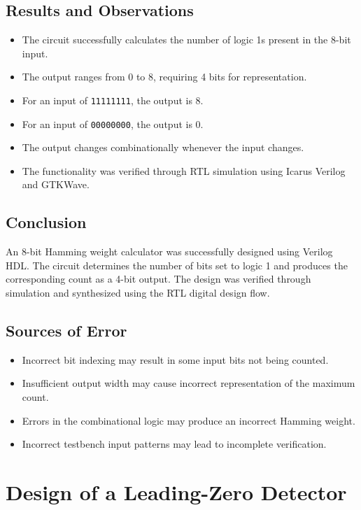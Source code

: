 \documentclass[12pt,a4paper]{report}
\begin{document}
\section{Results and Observations}

\begin{itemize}
    \item The circuit successfully calculates the number of logic 1s present in the 8-bit input.
    \item The output ranges from 0 to 8, requiring 4 bits for representation.
    \item For an input of \texttt{11111111}, the output is 8.
    \item For an input of \texttt{00000000}, the output is 0.
    \item The output changes combinationally whenever the input changes.
    \item The functionality was verified through RTL simulation using Icarus Verilog and GTKWave.
\end{itemize}

\section{Conclusion}

An 8-bit Hamming weight calculator was successfully designed using Verilog HDL. The circuit determines the number of bits set to logic 1 and produces the corresponding count as a 4-bit output. The design was verified through simulation and synthesized using the RTL digital design flow.

\section{Sources of Error}

\begin{itemize}
    \item Incorrect bit indexing may result in some input bits not being counted.
    \item Insufficient output width may cause incorrect representation of the maximum count.
    \item Errors in the combinational logic may produce an incorrect Hamming weight.
    \item Incorrect testbench input patterns may lead to incomplete verification.
\end{itemize}


\chapter{Design of a Leading-Zero Detector}
\label{ch:pdf19}
\end{document}
